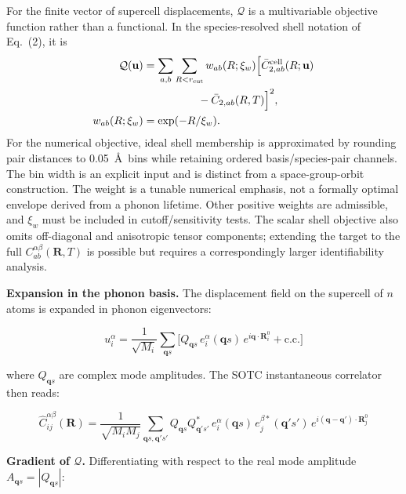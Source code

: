 \documentclass[aps,prb,reprint,amsmath,amssymb,floatfix]{revtex4-2}
\begin{document}
\color{revisionblue}
For the finite vector of supercell displacements, \(\mathcal Q\) is a
multivariable objective function rather than a functional. In the
species-resolved shell notation of Eq.~(2), it is
\begin{align*}
\mathcal Q(\mathbf u)
 &=\sum_{a,b}\sum_{R<r_{\rm cut}}w_{ab}(R;\xi_w)
 \Bigl[\bar C_{2,ab}^{\rm cell}(R;\mathbf u)\nonumber\\
 &\hspace{5em}-\bar C_{2,ab}(R,T)\Bigr]^2,\\
w_{ab}(R;\xi_w)&=\exp(-R/\xi_w).
\end{align*}
For the numerical objective, ideal shell membership is approximated by rounding
pair distances to 0.05~\AA\ bins while retaining ordered basis/species-pair
channels. The bin width is an explicit input and is distinct from a
space-group-orbit construction.
The weight is a tunable numerical emphasis, not a formally optimal envelope
derived from a phonon lifetime. Other positive weights are admissible, and
\(\xi_w\) must be included in cutoff/sensitivity tests. The scalar shell
objective also omits off-diagonal and anisotropic tensor components; extending
the target to the full \(C_{ab}^{\alpha\beta}(\mathbf R,T)\) is possible but
requires a correspondingly larger identifiability analysis.
\color{black}

\textbf{Expansion in the phonon basis.} The displacement field on the
supercell of \(n\) atoms is expanded in phonon eigenvectors:

\begin{equation*}
u_i^\alpha = \frac{1}{\sqrt{M_i}}\sum_{\mathbf{q}s}\bigl[Q_{\mathbf{q}s}\,e_i^\alpha(\mathbf{q}s)\,e^{i\mathbf{q}\cdot\mathbf{R}_i^0} + \text{c.c.}\bigr]
\end{equation*}

where \(Q_{\mathbf{q}s}\) are complex mode amplitudes. The SOTC
instantaneous correlator then reads:

\color{revisionblue}
{\scriptsize
\begin{equation*}
\hat{C}_{ij}^{\alpha\beta}(\mathbf{R}) = \frac{1}{\sqrt{M_iM_j}}\sum_{\mathbf{q}s,\mathbf{q}'s'} Q_{\mathbf{q}s}Q_{\mathbf{q}'s'}^*\, e_i^\alpha(\mathbf{q}s)\,e_j^{\beta*}(\mathbf{q}'s')\, e^{i(\mathbf{q}-\mathbf{q}')\cdot\mathbf{R}_j^0}
\end{equation*}
}
\color{black}

\textbf{Gradient of \(\mathcal{Q}\).} Differentiating with respect to
the real mode amplitude \(A_{\mathbf{q}s} = |Q_{\mathbf{q}s}|\):
\end{document}
